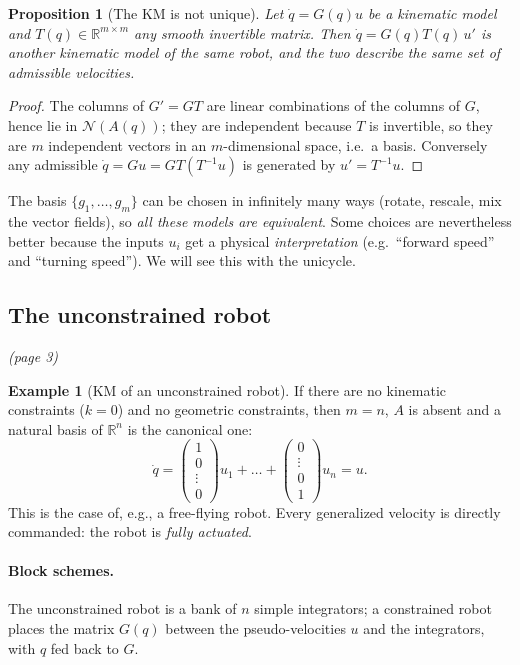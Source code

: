 \documentclass[11pt,a4paper]{article}
\newcommand{\R}{\mathbb{R}}
\newcommand{\N}{\mathcal{N}}
\newcommand{\dq}{\dot q}
\theoremstyle{definition}
\newtheorem{example}[definition]{Example}
\theoremstyle{plain}
\newtheorem{proposition}[definition]{Proposition}
\theoremstyle{remark}
\begin{document}
\begin{proposition}[The KM is not unique]\label{prop:nonuniq}
Let $\dq=G(q)u$ be a kinematic model and $T(q)\in\R^{m\times m}$ any smooth invertible matrix. Then $\dq=G(q)T(q)\,u'$ is another kinematic model of the same robot, and the two describe the same set of admissible velocities.
\end{proposition}
\begin{proof}
The columns of $G'=GT$ are linear combinations of the columns of $G$, hence lie in $\N(A(q))$; they are independent because $T$ is invertible, so they are $m$ independent vectors in an $m$-dimensional space, i.e.\ a basis. Conversely any admissible $\dq=Gu=GT(T^{-1}u)$ is generated by $u'=T^{-1}u$.
\end{proof}

\begin{intuition}
The basis $\{g_1,\dots,g_m\}$ can be chosen in infinitely many ways (rotate, rescale, mix the vector fields), so \emph{all these models are equivalent}. Some choices are nevertheless better because the inputs $u_i$ get a physical \emph{interpretation} (e.g.\ ``forward speed'' and ``turning speed''). We will see this with the unicycle.
\end{intuition}

\subsection{The unconstrained robot}\emph{(page 3)}

\begin{example}[KM of an unconstrained robot]
If there are no kinematic constraints ($k=0$) and no geometric constraints, then $m=n$, $A$ is absent and a natural basis of $\R^n$ is the canonical one:
\[
\dq=\begin{pmatrix}1\\0\\ \vdots\\0\end{pmatrix}u_1+\dots+\begin{pmatrix}0\\ \vdots\\0\\1\end{pmatrix}u_n = u .
\]
This is the case of, e.g., a free-flying robot. Every generalized velocity is directly commanded: the robot is \emph{fully actuated}.
\end{example}

\paragraph{Block schemes.} The unconstrained robot is a bank of $n$ simple integrators; a constrained robot places the matrix $G(q)$ between the pseudo-velocities $u$ and the integrators, with $q$ fed back to $G$.
\end{document}
